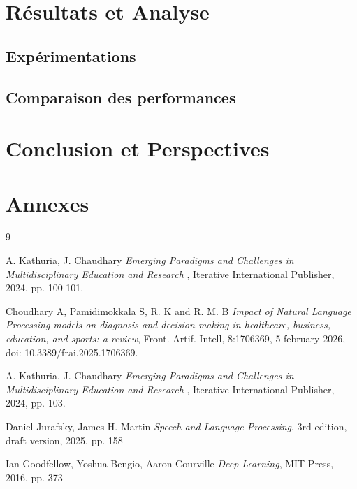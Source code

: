 \documentclass[12pt,a4paper]{report}
\begin{document}
	\chapter{Résultats et Analyse}
	\section{Expérimentations}
	\section{Comparaison des performances}
	
	\chapter{Conclusion et Perspectives}
	
	
	\appendix
	\chapter{Annexes}
	\begin{thebibliography}{9}
		
		A. Kathuria, J. Chaudhary
		\textit{Emerging Paradigms and Challenges in Multidisciplinary Education and Research },
		Iterative International Publisher, 2024, pp. 100-101.
		
		Choudhary A, Pamidimokkala S, R. K and R. M. B
		\textit{Impact of Natural Language Processing models on diagnosis and decision-making in healthcare, business, education, and sports: a review},
		Front. Artif. Intell, 8:1706369, 5 february 2026, doi: 10.3389/frai.2025.1706369.
		
				
		A. Kathuria, J. Chaudhary
		\textit{Emerging Paradigms and Challenges in Multidisciplinary Education and Research },
		Iterative International Publisher, 2024, pp. 103.
		
		Daniel Jurafsky, James H. Martin
		\textit{Speech and Language Processing}, 3rd edition, draft version, 2025, pp. 158
		
		Ian Goodfellow, Yoshua Bengio, Aaron Courville
		\textit{Deep Learning}, MIT Press, 2016, pp. 373
		
		
	\end{thebibliography}
	
\end{document}

